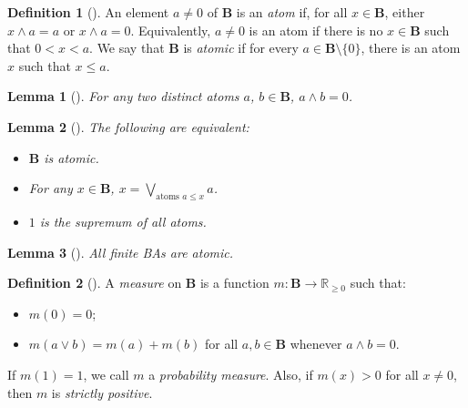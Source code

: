 \documentclass{article}
\newtheorem{lemma}{Lemma}
\theoremstyle{definition}
\newtheorem{definition}{Definition}
\theoremstyle{remark}
\begin{document}
\begin{definition}[\cite{DBLP:books/daglib/0090259,levasseur2012applied}]
  An element $a \ne 0$ of $\mathbf{B}$ is an \emph{atom} if, for all $x \in
  \mathbf{B}$, either $x \land a = a$ or $x \land a = 0$. Equivalently, $a \ne
  0$ is an atom if there is no $x \in \mathbf{B}$ such that $0 < x < a$. We say
  that $\mathbf{B}$ is \emph{atomic} if for every $a \in \mathbf{B} \setminus \{0
  \}$, there is an atom $x$ such that $x \le a$.
\end{definition}

\begin{lemma}[\cite{ganesh2006introduction}]
  For any two distinct atoms $a$, $b \in \mathbf{B}$, $a \land b = 0$.
\end{lemma}

\begin{lemma}[\cite{givant2008introduction}] \label{thm:representation}
  The following are equivalent:
  \begin{itemize}
  \item $\mathbf{B}$ is atomic.
  \item For any $x \in \mathbf{B}$, $x = \bigvee_{\text{atoms } a \le x} a$.
  \item $1$ is the supremum of all atoms.
  \end{itemize}
\end{lemma}

\begin{lemma}[\cite{givant2008introduction}] \label{lemma:atomic}
  All finite BAs are atomic.
\end{lemma}

\begin{definition}[\cite{gaifman1964concerning,DBLP:books/daglib/0090259}] \label{def:measure}
  A \emph{measure} on $\mathbf{B}$ is a function $m\colon
  \mathbf{B} \to \mathbb{R}_{\ge 0}$ such that:
  \begin{itemize}
  \item $m(0) = 0$;
  \item $m(a \lor b) = m(a) + m(b)$ for all $a, b \in \mathbf{B}$ whenever $a
    \land b = 0$.
  \end{itemize}
  If $m(1) = 1$, we call $m$ a \emph{probability measure}. Also, if $m(x) > 0$
  for all $x \ne 0$, then $m$ is \emph{strictly positive}.
\end{definition}
\end{document}
